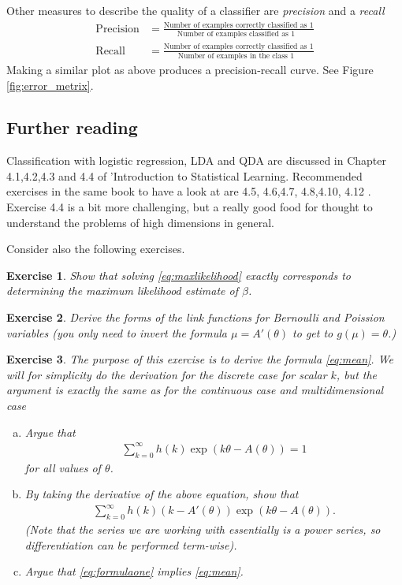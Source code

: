 \documentclass{article}
\newtheorem{exercise}{Exercise}
\begin{document}
Other measures to describe the quality of a classifier are 
\emph{precision} and a \emph{recall}
\begin{align*}
    \text{Precision}&= \frac{\text{Number of examples correctly classified as $1$}}{\text{Number of examples classified as $1$ }} \\
    \text{Recall}&= \frac{\text{Number of examples correctly classified as $1$}}{\text{Number of examples in the class $1$ }}
\end{align*}
Making a similar plot as above produces a precision-recall curve. See Figure \ref{fig:error_metrix}.



\subsection{Further reading}
Classification with logistic regression, LDA and QDA are discussed in Chapter 4.1,4.2,4.3 and 4.4 of 'Introduction to Statistical Learning. Recommended exercises in the same book to have a look at are 4.5, 4.6,4.7, 4.8,4.10, 4.12 . Exercise 4.4 is a bit more challenging, but a really good food for thought to understand the problems of high dimensions in general.

 Consider also the following exercises.

\begin{exercise}
    Show that solving \eqref{eq:maxlikelihood} exactly corresponds to determining the maximum likelihood estimate of $\beta$.
\end{exercise}

\begin{exercise}
    Derive the forms of the link functions for Bernoulli and Poission variables (you only need to invert the formula  $\mu = A'(\theta)$ to get to $g(\mu)=\theta$.)
\end{exercise}

\begin{exercise}
    The purpose of this exercise is to derive the formula \ref{eq:mean}. We will for simplicity do the derivation for the discrete case for scalar $k$, but the argument is exactly the same as for the continuous case and multidimensional case

    \begin{enumerate}[(a)]
        \item Argue that
        \begin{align*}
            \sum_{k=0}^\infty h(k) \exp(k\theta-A(\theta)) =1
        \end{align*}
        for all values of $\theta$.
        \item By taking the derivative of the above equation, show that
        \begin{align} \label{eq:formulaone}
            \sum_{k=0}^\infty h(k)(k-A'(\theta))\exp(k\theta-A(\theta)).
        \end{align}
       (Note that the series we are working with essentially is a power series, so differentiation can be performed term-wise).
        \item Argue that \eqref{eq:formulaone} implies \eqref{eq:mean}.
    \end{enumerate}
\end{exercise}
\end{document}
